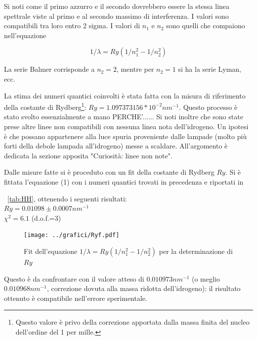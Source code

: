 \documentclass[a4paper,10pt]{article}
\begin{document}
{{{{{{{Si noti come il primo azzurro e il secondo dovrebbero essere la stessa linea spettrale viste al primo e al secondo massimo di interferenza. I valori sono compatibili tra loro entro 2 sigma.
I valori di $n_1$ e $n_2$ sono quelli che compaiono nell'equazione

\begin{equation}
 1/\lambda=Ry(1/n_1^2-1/n_2^2)
\end{equation} 
 
La serie Balmer corrisponde a $n_2=2$, mentre per $n_2=1$ si ha la serie Lyman, ecc.	

La stima dei numeri quantici coinvolti è stata fatta con la misura di riferimento della costante di Rydberg\footnote{ Questo valore è privo della correzione apportata dalla massa finita del nucleo dell'ordine del 1 per mille.}: $Ry=1.097373156 * 10^{-2} nm^{-1}$. Questo processo è stato svolto essenzialmente a mano PERCHE'......
Si noti inoltre che sono state prese altre linee non compatibili con nessuna linea nota dell'idrogeno. Un ipotesi è che possano appartenere alla luce spuria proveniente dalle lampade (molto più forti della debole lampada all'idrogeno) messe a scaldare. All'argomento è dedicata la sezione apposita "Curiosità: linee non note".


Dalle misure fatte si è proceduto con un fit della costante di Rydberg $Ry$. Si è fittata l'equazione (1) con i numeri quantici trovati in precedenza e riportati in \tablename{~\ref{tab:HH}, ottenendo i seguenti risultati:\\
$Ry= 0.01098 \pm 0.0007 nm^{-1}$ \\
$\chi^2=6.1$ (d.o.f.=3)

\begin{figure}[H]
	\centering
	\texttt{[image: ../grafici/Ryf.pdf]}
	\caption{Fit dell'equazione $1/\lambda=Ry(1/n_1^2-1/n_2^2)$ per la determinazione di $Ry$}
	\label{fig:cadmio}
\end{figure}


Questo è da confrontare con il valore atteso di $0.010973 nm^{-1}$ (o meglio $0.010968 nm^{-1}$, correzione dovuta alla massa ridotta dell'idrogeno): il risultato ottenuto è compatibile nell'errore sperimentale.
 

}}}}}}}}
\end{document}
